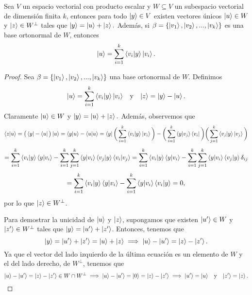 \documentclass[12pt,dvipsnames]{article}
\newenvironment{teorema}[2][Teorema]{\begin{trivlist}
\item[\hskip \labelsep {\bfseries #1}\hskip \labelsep {\bfseries #2.}]}{\end{trivlist}}
\begin{document}
\begin{teorema} {13.3.2}
    Sea $V$ un espacio vectorial con producto escalar y $W\subseteq V$ un subespacio vectorial de dimensión finita $k$, entonces para todo $\ket{y}\in V$ existen vectores únicos $\ket{u}\in W$ y $\ket{z}\in W^{\perp}$ tales que $\ket{y}=\ket{u}+\ket{z}.$ Además, si $\beta=\{\ket{v_1},\ket{v_2},...,\ket{v_k}\}$ es una base ortonormal de $W$, entonces $$\ket{u}=\sum_{i=1}^k \braket{v_i|y}\ket{v_i}.$$
    \begin{proof}
        Sea $\beta=\{\ket{v_1},\ket{v_2},...,\ket{v_k}\}$ una base ortonormal de $W$. Definimos \[
            \ket{u}=\sum_{i=1}^k\braket{v_i|y}\ket{v_i}\hspace{3mm}\text{y}\hspace{3mm}\ket{z}=\ket{y}-\ket{u}
        .\] \noindent Claramente $\ket{u}\in W$ y $\ket{y}=\ket{u}+\ket{z}.$ Además, observemos que \[
        \braket{z|u}=\big(\bra{y}-\bra{u}\big)\ket{u}=\braket{y|u}-\braket{u|u}=\bra{y}\bigg(\sum_{i=1}^k\braket{v_i|y}\ket{v_i}\bigg)-\bigg(\sum_{i=1}^k\braket{y|v_j}\bra{v_i}\bigg)\bigg(\sum_{j=1}^k \braket{v_j|y}\ket{v_j}\bigg)\] \[
    = \sum_{i=1}^k\braket{v_i|y}\braket{y|v_i}-\sum_{i=1}^k\sum_{j=1}^k\braket{y|v_i}\braket{v_j|y}\braket{v_i|v_j}=\sum_{i=1}^k\braket{v_i|y}\braket{y|v_i}-\sum_{i=1}^k\sum_{j=1}^k\braket{y|v_i}\braket{v_j|y}\delta_{ij}\] \[=\sum_{i=1}^k\braket{v_i|y}\braket{y|v_i}-\sum_{i=1}^k\braket{y|v_i}\braket{v_i|y}=0
,\] \noindent por lo que $\ket{z}\in W^{\perp}$. 

\vspace{3mm}
Para demostrar la unicidad de $\ket{u}$ y $\ket{z}$, supongamos que existen $\ket{u'}\in W$ y $\ket{z'}\in W^{\perp}$ tales que $\ket{y}=\ket{u'}+\ket{z'}$. Entonces, tenemos que \[
    \ket{y}=\ket{u'}+\ket{z'}=\ket{u}+\ket{z}\implies \ket{u}-\ket{u'}=\ket{z}-\ket{z'}
.\] \noindent Ya que el vector del lado izquierdo de la última ecuación es un elemento de $W$ y el del lado derecho, de $W^{\perp}$, tenemos que \[
\ket{u}-\ket{u'}=\ket{z}-\ket{z'}\in W\cap W^{\perp} \implies \ket{u}-\ket{u'}=\ket{0}=\ket{z}-\ket{z'}\implies \ket{u'}=\ket{u}\hspace{3mm} \text{y}\hspace{3mm} \ket{z'}=\ket{z}
.\] 
    \end{proof}
\end{teorema}
\end{document}

